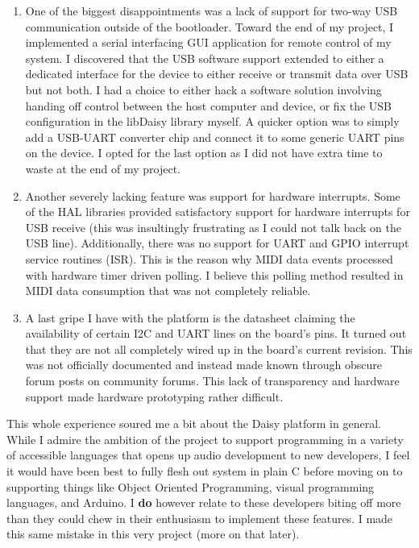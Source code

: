 \documentclass[acmlarge,screen]{acmart}
\begin{document}
	\begin{enumerate}
	\item One of the biggest disappointments was a lack of support for two-way USB communication outside of the bootloader. Toward the end of my project, I implemented a serial interfacing GUI application for remote control of my system. I discovered that the USB software support extended to either a dedicated interface for the device to either receive or transmit data over USB but not both. I had a choice to either hack a software solution involving handing off control between the host computer and device, or fix the USB configuration in the libDaisy library myself. A quicker option was to simply add a USB-UART converter chip and connect it to some generic UART pins on the device. I opted for the last option as I did not have extra time to waste at the end of my project.
	\item Another severely lacking feature was support for hardware interrupts. Some of the HAL libraries provided satisfactory support for hardware interrupts for USB receive (this was insultingly frustrating as I could not talk back on the USB line). Additionally, there was no support for UART and GPIO interrupt service routines (ISR). This is the reason why MIDI data events processed with hardware timer driven polling. I believe this polling method resulted in MIDI data consumption that was not completely reliable.
	\item A last gripe I have with the platform is the datasheet claiming the availability of certain I2C and UART lines on the board's pins. It turned out that they are not all completely wired up in the board's current revision. This was not officially documented and instead made known through obscure forum posts on community forums. This lack of transparency and hardware support made hardware prototyping rather difficult.
	\end{enumerate}

	This whole experience soured me a bit about the Daisy platform in general. While I admire the ambition of the project to support programming in a variety of accessible languages that opens up audio development to new developers, I feel it would have been best to fully flesh out system in plain C before moving on to supporting things like Object Oriented Programming, visual programming languages, and Arduino. I \textbf{do} however relate to these developers biting off more than they could chew in their enthusiasm to implement these features. I made this same mistake in this very project (more on that later).
\end{document}
